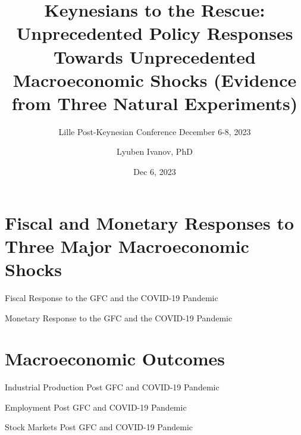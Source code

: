 \documentclass{beamer}
\title{Keynesians to the Rescue: Unprecedented Policy Responses Towards Unprecedented Macroeconomic Shocks (Evidence from Three Natural Experiments)}
\subtitle{Lille Post-Keynesian Conference 
\newline December 6-8, 2023 }
\date{Dec 6, 2023}
\author{Lyuben Ivanov, PhD}
\institute{Faculty of Economics and Business, Sofia University St. Kliment Ohridski}
\begin{document}
\maketitle

\section{Fiscal and Monetary Responses to Three Major Macroeconomic Shocks}

\begin{frame}{Fiscal Response to the GFC and the COVID-19 Pandemic}

\begin{figure}[h!]
     \centering
     
\end{figure} 
	
\end{frame}

\begin{frame}{Monetary Response to the GFC and the COVID-19 Pandemic}

\begin{figure}[h!]
     \centering
     
\end{figure} 
	
\end{frame}


\section{Macroeconomic Outcomes}

\begin{frame}{Industrial Production Post GFC and COVID-19 Pandemic}

\begin{figure}[h!]
     \centering
     
\end{figure} 
	
\end{frame}

\begin{frame}{Employment Post GFC and COVID-19 Pandemic}

\begin{figure}[h!]
     \centering
     
\end{figure} 
	
\end{frame}

\begin{frame}{Stock Markets Post GFC and COVID-19 Pandemic}

\begin{figure}[h!]
     \centering
     
\end{figure} 
	
\end{frame}
\end{document}
